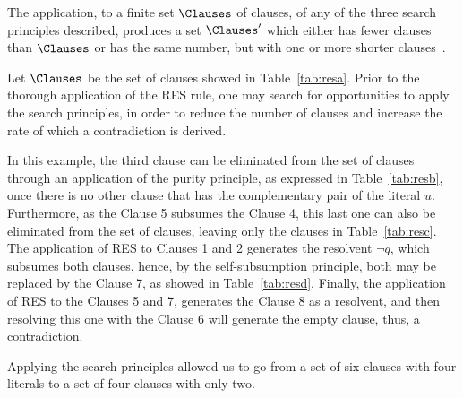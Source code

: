 The application, to a finite set $\Clauses$ of clauses, of any of the three
search principles described, produces a set $\Clauses'$ which either has fewer
clauses than $\Clauses$ or has the same number, but with one or more shorter
clauses~\cite{Robinson65}. 

\begin{example}
    Let $\Clauses$ be the set of clauses showed in Table~\ref{tab:resa}. Prior
    to the thorough application of the RES rule, one may search for
    opportunities to apply the search principles, in order to reduce the
    number of clauses and increase the rate of which a contradiction is derived.

    In this example, the third clause can be eliminated from the set of clauses
    through an application of the purity principle, as expressed in
    Table~\ref{tab:resb}, once there is no other clause that has the
    complementary pair of the literal $u$. 
    Furthermore, as the Clause 5 subsumes the Clause 4, this last one can also
    be eliminated from the set of clauses, leaving only the clauses in
    Table~\ref{tab:resc}.
    The application of RES to Clauses 1 and 2 generates the resolvent
    $\neg q$, which subsumes both clauses, hence, by the self-subsumption principle,
    both may be replaced by the Clause 7, as showed in Table~\ref{tab:resd}.
    Finally, the application of RES to the Clauses 5 and 7, generates the Clause
    8 as a resolvent, and then resolving this one with the Clause 6 will
    generate the empty clause, thus, a contradiction. 

    Applying the search principles allowed us to go from a set of six clauses
    with four literals to a set of four clauses with only two.


\end{example}
